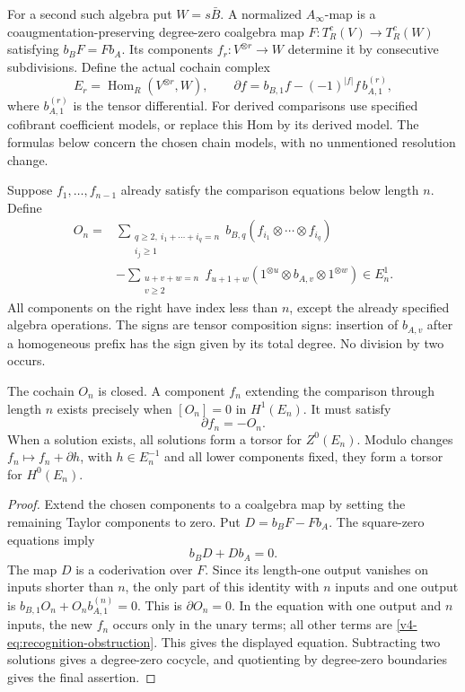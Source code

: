 For a second such algebra put \(W=s\bar B\). A normalized
\(A_\infty\)-map is a coaugmentation-preserving degree-zero
coalgebra map
\(F:T_R^c(V)\to T_R^c(W)\) satisfying
\(b_BF=Fb_A\). Its components
\(f_r:V^{\otimes r}\to W\) determine it by consecutive
subdivisions. Define the actual cochain complex
\begin{equation}\label{v4-eq:recognition-hom-complex}
 E_r=\operatorname{Hom}_R(V^{\otimes r},W),\qquad
 \partial f=b_{B,1}f-(-1)^{|f|}f\,b_{A,1}^{(r)},
\end{equation}
where \(b_{A,1}^{(r)}\) is the tensor differential. For derived
comparisons use specified cofibrant coefficient models, or
replace this Hom by its derived model. The formulas below concern
the chosen chain models, with no unmentioned resolution change.

Suppose \(f_1,\ldots,f_{n-1}\) already satisfy the comparison
equations below length \(n\). Define
\begin{equation}\label{v4-eq:recognition-obstruction}
 \begin{split}
 O_n={}&
 \sum_{\substack{q\geq2,\ i_1+\cdots+i_q=n\\i_j\geq1}}
       b_{B,q}(f_{i_1}\otimes\cdots\otimes f_{i_q})\\
 &-\sum_{\substack{u+v+w=n\\v\geq2}}
       f_{u+1+w}(1^{\otimes u}\otimes b_{A,v}\otimes1^{\otimes w})
       \in E_n^1.
 \end{split}
\end{equation}
All components on the right have index less than \(n\), except
the already specified algebra operations. The signs are tensor
composition signs: insertion of \(b_{A,v}\) after a homogeneous
prefix has the sign given by its total degree. No division by
two occurs.

\begin{theorem}
\label{v4-thm:recognition-one-step}
The cochain \(O_n\) is closed. A component \(f_n\) extending
the comparison through length \(n\) exists precisely when
\([O_n]=0\) in \(H^1(E_n)\). It must satisfy
\[
 \partial f_n=-O_n.
\]
When a solution exists, all solutions form a torsor for
\(Z^0(E_n)\). Modulo changes \(f_n\mapsto f_n+\partial h\),
with \(h\in E_n^{-1}\) and all lower components fixed, they
form a torsor for \(H^0(E_n)\).
\end{theorem}

\begin{proof}
Extend the chosen components to a coalgebra map by setting the
remaining Taylor components to zero. Put \(D=b_BF-Fb_A\).
The square-zero equations imply
\[
 b_BD+Db_A=0.
\]
The map \(D\) is a coderivation over \(F\). Since its
length-one output vanishes on inputs shorter than \(n\), the
only part of this identity with \(n\) inputs and one output is
\(b_{B,1}O_n+O_n b_{A,1}^{(n)}=0\). This is
\(\partial O_n=0\). In the equation with one output and
\(n\) inputs, the new \(f_n\) occurs only in the unary terms;
all other terms are \eqref{v4-eq:recognition-obstruction}.
This gives the displayed equation. Subtracting two solutions
gives a degree-zero cocycle, and quotienting by degree-zero
boundaries gives the final assertion.
\end{proof}

